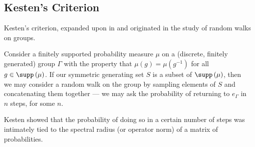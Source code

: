 \subsection{Kesten's Criterion}%
Kesten's criterion, expanded upon in \cite{kesten_random_walks} and \cite{kesten_means} originated in the study of random walks on groups.\newline

Consider a finitely supported probability measure $\mu$ on a (discrete, finitely generated) group $\Gamma$ with the property that $\mu\left( g \right) = \mu\left( g^{-1} \right)$ for all $g\in \supp\left( \mu \right)$. If our symmetric generating set $S$ is a subset of $\supp\left( \mu \right)$, then we may consider a random walk on the group by sampling elements of $S$ and concatenating them together --- we may ask the probability of returning to $e_{\Gamma}$ in $n$ steps, for some $n$.\newline

Kesten showed that the probability of doing so in a certain number of steps was intimately tied to the spectral radius (or operator norm) of a matrix of probabilities.\newline

